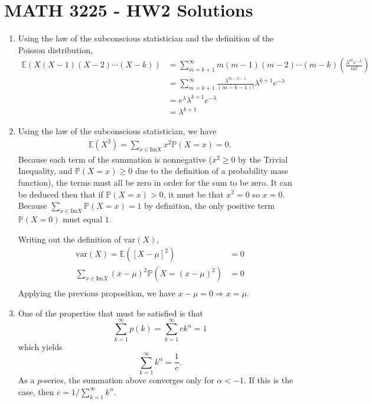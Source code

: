\documentclass[a4paper,12pt]{article}
\begin{document}
\section*{MATH 3225 - HW2 Solutions}
\begin{enumerate}
    \item
        Using the law of the subconscious statistician and the definition of the Poisson distribution,
        \begin{align*}
            \mathbb{E}\left(X(X - 1)(X - 2)\cdots(X - k)\right) &= \sum_{m = k + 1}^{\infty} m(m - 1)(m - 2)\cdots(m - k) \left( \frac{\lambda^m e^{-\lambda}}{m!} \right) \\
            &= \sum_{m = k + 1}^{\infty} \frac{\lambda^{m - k - 1}}{(m - k - 1)!} \lambda^{k + 1} e^{-\lambda} \\
            &= e^\lambda \lambda^{k + 1} e^{-\lambda} \\
            &= \lambda^{k + 1}
        \end{align*}

    \setcounter{enumi}{2}
    \item
        Using the law of the subconscious statistician, we have
        \begin{align*}
            \mathbb{E} (X^2) = \sum_{x \in \text{Im}X} x^2 \mathbb{P}(X = x) = 0.
        \end{align*}
        Because each term of the summation is nonnegative ($x^2 \geq 0$ by the Trivial Inequality, and $\mathbb{P}(X = x) \geq 0$ due to the definition of a probability mass function), the terms must all be zero in order for the sum to be zero. It can be deduced then that if $\mathbb{P}(X = x) > 0$, it must be that $x^2 = 0$ so $x = 0$. Because $\sum_{x \in \text{Im}X} \mathbb{P}(X = x) = 1$ by definition, the only positive term $\mathbb{P}(X = 0)$ must equal $1$. \par
        Writing out the definition of $\text{var}(X)$,
        \begin{align*}
            \text{var}(X) = \mathbb{E}([X - \mu]^2) &= 0 \\
            \sum_{x \in \text{Im}X} (x - \mu)^2 \mathbb{P}(X = (x - \mu)^2) &= 0 \\
        \end{align*}
        Applying the previous proposition, we have $x - \mu = 0 \Rightarrow x = \mu$.

    \item
        One of the properties that must be satisfied is that
        \[
            \sum_{k = 1}^{\infty} p(k) = \sum_{k = 1}^{\infty} ck^\alpha = 1
        \]
        which yields
        \[
            \sum_{k = 1}^{\infty} k^\alpha = \frac{1}{c}.
        \]
        As a $p$-series, the summation above converges only for $\alpha < - 1$. If this is the case, then $c = 1 / \sum_{k = 1}^\infty k^\alpha$.


\end{enumerate}
\end{document}
